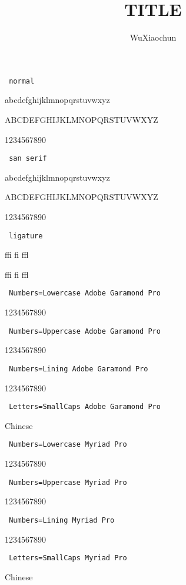 ﻿\documentclass[a4paper,onecolumn]{article}
\title{TITLE}
\author{WuXiaochun}
\date{}
\newcommand{\describe}[1]{\texttt{\color{red} #1}}
\begin{document}
\describe{normal}

abcdefghijklmnopqrstuvwxyz

ABCDEFGHIJKLMNOPQRSTUVWXYZ

1234567890

\describe{san serif}

{\sffamily
abcdefghijklmnopqrstuvwxyz

ABCDEFGHIJKLMNOPQRSTUVWXYZ

1234567890}

\describe{ligature}

ffi fi ffl

\textsf{ffi fi ffl}

\describe{Numbers=Lowercase Adobe Garamond Pro}

1234567890

\describe{Numbers=Uppercase Adobe Garamond Pro}

1234567890

\describe{Numbers=Lining Adobe Garamond Pro}

1234567890

\describe{Letters=SmallCaps Adobe Garamond Pro}

Chinese


\describe{Numbers=Lowercase Myriad Pro}

1234567890

\describe{Numbers=Uppercase Myriad Pro}

1234567890

\describe{Numbers=Lining Myriad Pro}

1234567890

\describe{Letters=SmallCaps Myriad Pro}

Chinese
\end{document}
